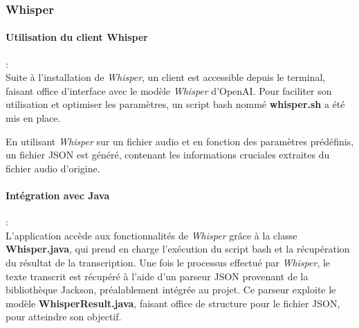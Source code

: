 \subsubsection{Whisper}
\label{sec:whisperImpl}

\paragraph*{Utilisation du client Whisper} : \\

Suite à l'installation de \textit{Whisper}, un client est accessible depuis le terminal, faisant office d'interface avec le modèle \textit{Whisper} d'OpenAI. 
Pour faciliter son utilisation et optimiser les paramètres, un script bash nommé \textbf{whisper.sh} a été mis en place.

En utilisant \textit{Whisper} sur un fichier audio et en fonction des paramètres prédéfinis, un fichier JSON est généré, contenant les informations cruciales extraites du fichier audio d'origine.

\paragraph*{Intégration avec Java} : \\

L'application accède aux fonctionnalités de \textit{Whisper} grâce à la classe \textbf{Whisper.java}, qui prend en charge l'exécution du script bash et la récupération du résultat de la transcription. 
Une fois le processus effectué par \textit{Whisper}, le texte transcrit est récupéré à l'aide d'un parseur JSON provenant de la bibliothèque Jackson, préalablement intégrée au projet. 
Ce parseur exploite le modèle \textbf{WhisperResult.java}, faisant office de structure pour le fichier JSON, pour atteindre son objectif.